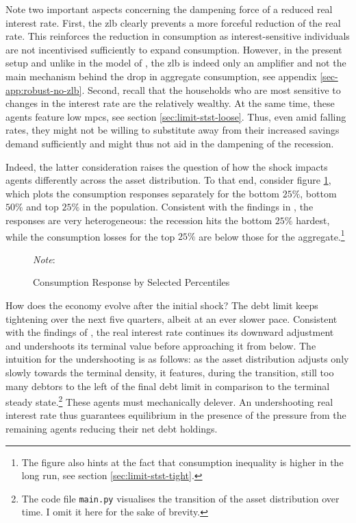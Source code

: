 \documentclass[12pt]{article} %
\numberwithin{equation}{section} %
\numberwithin{figure}{section}
\numberwithin{table}{section}
\begin{document}
Note two important aspects concerning the dampening force of a reduced real interest rate. First, the \Gls{zlb} clearly prevents a more forceful reduction of the real rate. This reinforces the reduction in consumption as interest-sensitive individuals are not incentivised sufficiently to expand consumption. However, in the present setup and unlike in the model of \textcite{egg2012}, the \Gls{zlb} is indeed only an amplifier and not the main mechanism behind the drop in aggregate consumption, see appendix \ref{sec-app:robust-no-zlb}. Second, recall that the households who are most sensitive to changes in the interest rate are the relatively wealthy. At the same time, these agents feature low \Gls{mpc}s, see section \ref{sec:limit-stst-loose}. Thus, even amid falling rates, they might not be willing to substitute away from their increased savings demand sufficiently and might thus not aid in the dampening of the recession. 

Indeed, the latter consideration raises the question of how the shock impacts agents differently across the asset distribution. To that end, consider figure \ref{fig:baseline-permanent-limit-dist-c-response}, which plots the consumption responses separately for the bottom $25\%$, bottom $50\%$ and top $25\%$ in the population. Consistent with the findings in \textcite{gl2017}, the responses are very heterogeneous: the recession hits the bottom $25\%$ hardest, while the consumption losses for the top $25\%$ are below those for the aggregate.\footnote{The figure also hints at the fact that consumption inequality is higher in the long run, see section \ref{sec:limit-stst-tight}.} 

\begin{figure}[ht]
    \centering
    \caption{Consumption Response by Selected Percentiles}
    \label{fig:baseline-permanent-limit-dist-c-response}
    

    \vspace{10pt}
    
    \begin{minipage}{0.75\textwidth} %
    \footnotesize
    \textit{Note}: 
    \end{minipage}
\end{figure}

How does the economy evolve after the initial shock? The debt limit keeps tightening over the next five quarters, albeit at an ever slower pace. Consistent with the findings of \textcite{gl2017}, the real interest rate continues its downward adjustment and undershoots its terminal value before approaching it from below. The intuition for the undershooting is as follows: as the asset distribution adjusts only slowly towards the terminal density, it features, during the transition, still too many debtors to the left of the final debt limit in comparison to the terminal steady state.\footnote{The code file \texttt{main.py} visualises the transition of the asset distribution over time. I omit it here for the sake of brevity.} These agents must mechanically delever. An undershooting real interest rate thus guarantees equilibrium in the presence of the pressure from the remaining agents reducing their net debt holdings.
\end{document}
